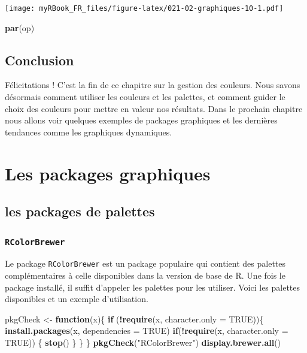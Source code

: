 \documentclass[]{book}
\newenvironment{Shaded}{\begin{snugshade}}{\end{snugshade}}
\newcommand{\ControlFlowTok}[1]{\textcolor[rgb]{0.13,0.29,0.53}{\textbf{#1}}}
\newcommand{\DataTypeTok}[1]{\textcolor[rgb]{0.13,0.29,0.53}{#1}}
\newcommand{\KeywordTok}[1]{\textcolor[rgb]{0.13,0.29,0.53}{\textbf{#1}}}
\newcommand{\NormalTok}[1]{#1}
\newcommand{\OperatorTok}[1]{\textcolor[rgb]{0.81,0.36,0.00}{\textbf{#1}}}
\newcommand{\OtherTok}[1]{\textcolor[rgb]{0.56,0.35,0.01}{#1}}
\newcommand{\StringTok}[1]{\textcolor[rgb]{0.31,0.60,0.02}{#1}}
\begin{document}
\texttt{[image: myRBook\_FR\_files/figure-latex/021-02-graphiques-10-1.pdf]}

\begin{Shaded}
\begin{Highlighting}[]
\KeywordTok{par}\NormalTok{(op)}
\end{Highlighting}
\end{Shaded}

\hypertarget{conclusion-9}{%
\section{Conclusion}\label{conclusion-9}}

Félicitations ! C'est la fin de ce chapitre sur la gestion des couleurs. Nous savons désormais comment utiliser les couleurs et les palettes, et comment guider le choix des couleurs pour mettre en valeur nos résultats. Dans le prochain chapitre nous allons voir quelques exemples de packages graphiques et les dernières tendances comme les graphiques dynamiques.

\hypertarget{graph3}{%
\chapter{Les packages graphiques}\label{graph3}}

\hypertarget{les-packages-de-palettes}{%
\section{les packages de palettes}\label{les-packages-de-palettes}}

\hypertarget{rcolorbrewer}{%
\subsection{\texorpdfstring{\texttt{RColorBrewer}}{RColorBrewer}}\label{rcolorbrewer}}

Le package \texttt{RColorBrewer} est un package populaire qui contient des palettes complémentaires à celle disponibles dans la version de base de R. Une fois le package installé, il suffit d'appeler les palettes pour les utiliser. Voici les palettes disponibles et un exemple d'utilisation.

\begin{Shaded}
\begin{Highlighting}[]
\NormalTok{pkgCheck <-}\StringTok{ }\ControlFlowTok{function}\NormalTok{(x)\{ }
    \ControlFlowTok{if}\NormalTok{ (}\OperatorTok{!}\KeywordTok{require}\NormalTok{(x, }\DataTypeTok{character.only =} \OtherTok{TRUE}\NormalTok{))\{}
        \KeywordTok{install.packages}\NormalTok{(x, }\DataTypeTok{dependencies =} \OtherTok{TRUE}\NormalTok{)}
        \ControlFlowTok{if}\NormalTok{(}\OperatorTok{!}\KeywordTok{require}\NormalTok{(x, }\DataTypeTok{character.only =} \OtherTok{TRUE}\NormalTok{)) \{}
            \KeywordTok{stop}\NormalTok{()}
\NormalTok{        \}}
\NormalTok{    \}}
\NormalTok{\}}
\KeywordTok{pkgCheck}\NormalTok{(}\StringTok{"RColorBrewer"}\NormalTok{)}
\KeywordTok{display.brewer.all}\NormalTok{()}
\end{Highlighting}
\end{Shaded}
\end{document}
